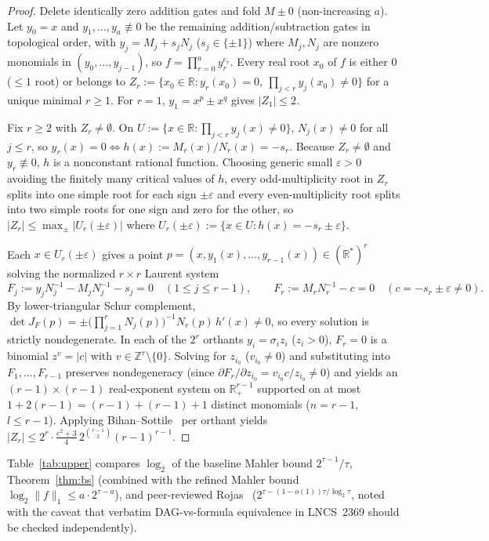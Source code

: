 \documentclass[11pt]{article}
\newcommand{\Z}{\mathbb{Z}}
\newcommand{\R}{\mathbb{R}}
\begin{document}
\begin{proof}
Delete identically zero addition gates and fold $M \pm 0$ (non-increasing $a$). Let $y_0 = x$ and $y_1, \dots, y_a \not\equiv 0$ be the remaining addition/subtraction gates in topological order, with $y_j = M_j + s_j N_j$ ($s_j \in \{\pm 1\}$) where $M_j, N_j$ are nonzero monomials in $(y_0, \dots, y_{j-1})$, so $f = \prod_{r=0}^a y_r^{e_r}$. Every real root $x_0$ of $f$ is either $0$ ($\le 1$ root) or belongs to $Z_r := \{x_0 \in \R : y_r(x_0) = 0,\ \prod_{j < r} y_j(x_0) \neq 0\}$ for a unique minimal $r \ge 1$. For $r = 1$, $y_1 = x^p \pm x^q$ gives $|Z_1| \le 2$.

Fix $r \ge 2$ with $Z_r \neq \emptyset$. On $U := \{x \in \R : \prod_{j < r} y_j(x) \neq 0\}$, $N_j(x) \neq 0$ for all $j \le r$, so $y_r(x) = 0 \iff h(x) := M_r(x)/N_r(x) = -s_r$. Because $Z_r \neq \emptyset$ and $y_r \not\equiv 0$, $h$ is a nonconstant rational function. Choosing generic small $\varepsilon > 0$ avoiding the finitely many critical values of $h$, every odd-multiplicity root in $Z_r$ splits into one simple root for each sign $\pm\varepsilon$ and every even-multiplicity root splits into two simple roots for one sign and zero for the other, so $|Z_r| \le \max_{\pm} |U_r(\pm\varepsilon)|$ where $U_r(\pm\varepsilon) := \{x \in U : h(x) = -s_r \pm \varepsilon\}$.

Each $x \in U_r(\pm\varepsilon)$ gives a point $p = (x, y_1(x), \dots, y_{r-1}(x)) \in (\R^*)^r$ solving the normalized $r \times r$ Laurent system
\[
  F_j := y_j N_j^{-1} - M_j N_j^{-1} - s_j = 0 \quad (1 \le j \le r-1), \qquad
  F_r := M_r N_r^{-1} - c = 0 \quad (c = -s_r \pm \varepsilon \neq 0).
\]
By lower-triangular Schur complement, $\det J_F(p) = \pm \bigl(\prod_{j=1}^r N_j(p)\bigr)^{-1} N_r(p)\, h'(x) \neq 0$, so every solution is strictly nondegenerate. In each of the $2^r$ orthants $y_i = \sigma_i z_i$ ($z_i > 0$), $F_r = 0$ is a binomial $z^v = |c|$ with $v \in \Z^r \setminus \{0\}$. Solving for $z_{i_0}$ ($v_{i_0} \neq 0$) and substituting into $F_1, \dots, F_{r-1}$ preserves nondegeneracy (since $\partial F_r / \partial z_{i_0} = v_{i_0} c / z_{i_0} \neq 0$) and yields an $(r-1) \times (r-1)$ real-exponent system on $\R_+^{r-1}$ supported on at most $1 + 2(r-1) = (r-1) + (r-1) + 1$ distinct monomials ($n = r - 1$, $l \le r - 1$). Applying Bihan--Sottile~\cite[Theorem~1]{BihanSottile2007} per orthant yields $|Z_r| \le 2^r \cdot \frac{e^2+3}{4}\, 2^{\binom{r-1}{2}} (r-1)^{r-1}$.
\end{proof}

Table~\ref{tab:upper} compares $\log_2$ of the baseline Mahler bound $2^{\tau-1}/\tau$, Theorem~\ref{thm:bs} (combined with the refined Mahler bound $\log_2\|f\|_1 \le a \cdot 2^{\tau-a}$), and peer-reviewed Rojas~\cite{Rojas2002} ($2^{\tau - (1-o(1))\tau/\log_2\tau}$, noted with the caveat that verbatim DAG-vs-formula equivalence in LNCS~2369 should be checked independently).
\end{document}
